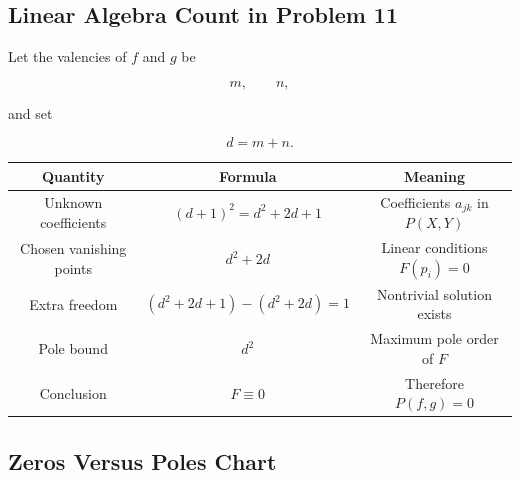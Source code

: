 \documentclass[12pt,a4paper]{article}
\theoremstyle{notespace}
\begin{document}
\subsection{Linear Algebra Count in Problem 11}

Let the valencies of \(f\) and \(g\) be

\[
m,\qquad n,
\]

and set

\[
d=m+n.
\]

\begin{center}
	\renewcommand{\arraystretch}{1.5}
	\begin{tabular}{|c|c|c|}
		\hline
		\rowcolor{blue!15}
		Quantity & Formula & Meaning \\
		\hline
		
		Unknown coefficients
		&
		\((d+1)^2=d^2+2d+1\)
		&
		Coefficients \(a_{jk}\) in \(P(X,Y)\)
		\\
		\hline
		
		Chosen vanishing points
		&
		\(d^2+2d\)
		&
		Linear conditions \(F(p_i)=0\)
		\\
		\hline
		
		Extra freedom
		&
		\((d^2+2d+1)-(d^2+2d)=1\)
		&
		Nontrivial solution exists
		\\
		\hline
		
		Pole bound
		&
		\(d^2\)
		&
		Maximum pole order of \(F\)
		\\
		\hline
		
		Conclusion
		&
		\(F\equiv 0\)
		&
		Therefore \(P(f,g)=0\)
		\\
		\hline
		
	\end{tabular}
\end{center}

\subsection{Zeros Versus Poles Chart}
\end{document}
